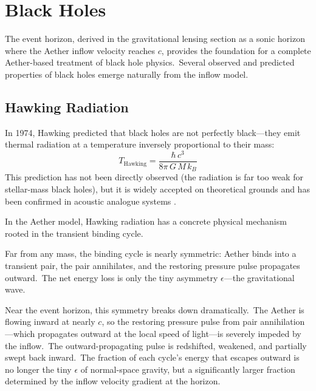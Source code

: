 ﻿\documentclass[12pt,letterpaper]{article}
\begin{document}
\section{Black Holes}
\label{sec:black-holes}

The event horizon, derived in the gravitational lensing section as a sonic horizon where
the Aether inflow velocity reaches $c$, provides the foundation for a complete Aether-based
treatment of black hole physics.\ Several observed and predicted properties of black holes
emerge naturally from the inflow model.


\subsection{Hawking Radiation}

In 1974, Hawking \cite{hawking1974,hawking1975} predicted that black holes are not perfectly black---they emit thermal
radiation at a temperature inversely proportional to their mass:
%
\begin{equation}
  T_{\mathrm{Hawking}} = \frac{\hbar \, c^3}{8\pi \, G \, M \, k_B}
\end{equation}
%
This prediction has not been directly observed (the radiation is far too weak for stellar-mass black holes), but it is widely accepted on theoretical grounds and has been confirmed
in acoustic analogue systems \cite{steinhauer2019}.

In the Aether model, Hawking radiation has a concrete physical mechanism rooted in the
transient binding cycle.

Far from any mass, the binding cycle is nearly symmetric: Aether binds into a transient
pair, the pair annihilates, and the restoring pressure pulse propagates outward.\ The net
energy loss is only the tiny asymmetry $\epsilon$---the gravitational wave.

Near the event horizon, this symmetry breaks down dramatically.\ The Aether is flowing
inward at nearly $c$, so the restoring pressure pulse from pair annihilation---which
propagates outward at the local speed of light---is severely impeded by the inflow.\ The
outward-propagating pulse is redshifted, weakened, and partially swept back inward.\ The
fraction of each cycle's energy that escapes outward is no longer the tiny $\epsilon$ of
normal-space gravity, but a significantly larger fraction determined by the inflow
velocity gradient at the horizon.
\end{document}
